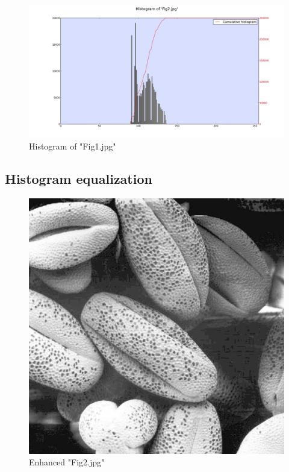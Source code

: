     \begin{figure}[h]
        \centering
        \includegraphics[width=\linewidth]{./images/Histogram_Fig2.jpg}
        \caption{Histogram of "Fig1.jpg"}
        \label{diagram:hist_fig2}
    \end{figure}

    \subsection{Histogram equalization}

    \begin{figure}[h]
        \centering
        \includegraphics[width=\linewidth]{./images/Enhanced_Fig2.jpg}
        \caption{Enhanced "Fig2.jpg"}
        \label{diagram:enhanced_fig2}
    \end{figure}

